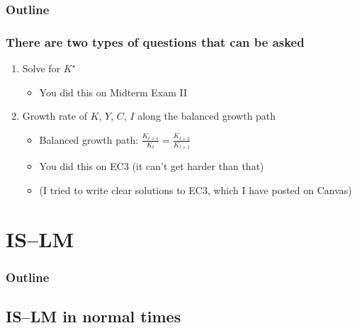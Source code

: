 \documentclass[presentation,dvipsnames]{beamer}
\begin{document}
\begin{frame}
\frametitle{Outline}
\tableofcontents[currentsection]
\end{frame}

\begin{frame}
\frametitle{There are two types of questions that can be asked}

\begin{enumerate}[label=(\roman*)]
\item\label{item:3} Solve for $K^{\star}$
\begin{itemize}[label={--}]
\item You did this on Midterm Exam II
\end{itemize}
\item Growth rate of $K$, $Y$, $C$, $I$ along the balanced growth path
\begin{itemize}[label={--}]
\item Balanced growth path: $\frac{K_{t+1}}{K_{t}} = \frac{K_{t+2}}{K_{t+1}}$
\item You did this on EC3 (it can't get harder than that)
\item (I tried to write clear solutions to EC3, which I have posted on Canvas)
\end{itemize}
\end{enumerate}


\end{frame}

\section{IS--LM}

\begin{frame}
\frametitle{Outline}
\tableofcontents[currentsection]
\end{frame}

\subsection{IS--LM in normal times}
\label{sec-5}
\end{document}
